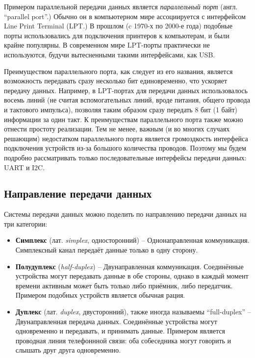 \documentclass[../sparc.tex]{subfiles}
\begin{document}
Примером параллельной передачи данных является \emph{параллельный порт} (англ.
``parallel port''.) Обычно он в компьютерном мире ассоциируется с интерфейсом
Line Print Terminal (\gls{LPT}.)  В прошлом (c 1970-х по 2000-е года) подобные
порты использовались для подключения принтеров к компьютерам, и были крайне
популярны.  В современном мире LPT-порты практически не используются, будучи
вытесненными такими интерфейсами, как USB.

Преимуществом параллельного порта, как следует из его названия, является
возможность передавать сразу несколько бит единовременно, что ускоряет передачу
данных.  Например, в LPT-портах для передачи данных использовалось восемь линий
(не считая вспомогательных линий, вроде питания, общего провода и тактового
импульса), позволяя таким образом сразу передать 8 бит (1 байт) информации за
один такт.  К преимуществам параллельного порта также можно отнести простоту
реализации.  Тем не менее, важным (и во многих случаях решающим) недостатком
параллельного порта является громоздкость интерфейса подключения устройств из-за
большого количества проводов.  Поэтому мы будем подробно рассматривать только
последовательные интерфейсы передачи данных: \gls{UART} и I2C.


\subsection{Направление передачи данных}

Системы передачи данных можно поделить по направлению передачи данных на три
категории:

\begin{itemize}
\item \textbf{Симплекс} (лат. \emph{simplex}, односторонний) -- Однонаправленная
  коммуникация.  Симплексный канал передаёт данные только в одну сторону.
\item \textbf{Полудуплекс} (\emph{half-duplex}) -- Двунаправленная коммуникация.
  Соединённые устройства могут передавать данные в обе стороны, однако в каждый
  момент времени активным может быть только либо приёмник, либо передатчик.
  Примером подобных устройств является обычная рация.
\item \textbf{Дуплекс} (лат. \emph{duplex}, двусторонний), также иногда
  называемы ``full-duplex'' -- Двунаправленная передача данных.  Соединённые
  устройства могут одновременно и передавать, и принимать данные.  Примером
  является проводная линия телефоннной связи: оба собеседника могут говорить и
  слышать друг друга одновременно.
\end{itemize}
\end{document}
